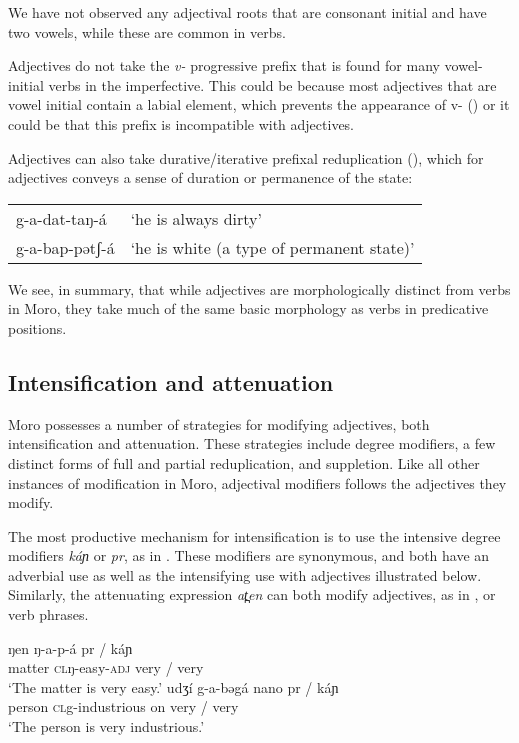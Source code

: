 We have not observed any adjectival roots that are consonant initial and have two vowels, while these are common in verbs. 

Adjectives do not take the \textit{v-} progressive prefix that is found for many vowel-initial verbs in the imperfective. This could be because most adjectives that are vowel initial contain a labial element, which prevents the appearance of v- () or it could be that this prefix is incompatible with adjectives.

Adjectives can also take durative/iterative prefixal reduplication (), which for adjectives conveys a sense of duration or permanence of the state:

\ea 
\begin{tabular}[t]{ll}
g-a-dat-taŋ-á & ‘he is always dirty’\\
g-a-bap-pətʃ-á & ‘he is white (a type of permanent state)’\\
\end{tabular} 
\z

We see, in summary, that while adjectives are morphologically distinct from verbs in Moro, they take much of the same basic morphology as verbs in predicative positions.

\subsection{Intensification and attenuation}

Moro possesses a number of strategies for modifying adjectives, both intensification and attenuation. These strategies include degree modifiers, a few distinct forms of full and partial reduplication, and suppletion. Like all other instances of modification in Moro, adjectival modifiers follows the adjectives they modify.

The most productive mechanism for intensification is to use the intensive degree modifiers \textit{káɲ} or \textit{pr}, as in . These modifiers are synonymous, and both have an adverbial use as well as the intensifying use with adjectives illustrated below. Similarly, the attenuating expression \textit{at̪en} can both modify adjectives, as in , or verb phrases.


\ea
	\ea 
		\gll ŋen ŋ-a-p-á 	pr	/ káɲ\\ 
			matter	\textsc{cl}ŋ-easy-\textsc{adj}	very / very\\
		\glt ‘The matter is very easy.’
	\ex	 
		\gll udʒí 		g-a-bəgá nano	 	pr / káɲ	\\ 
			person	\textsc{cl}g-industrious on 	very / very\\
		\glt ‘The person is very industrious.'
	\z  \label{ex:ch10:very}
\z 
	
